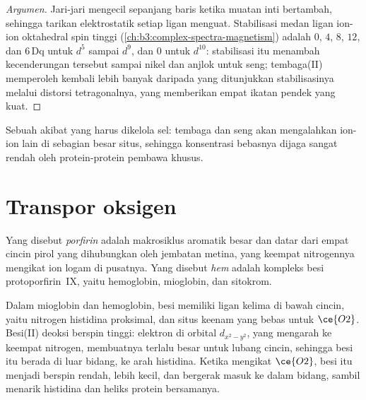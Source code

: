 \begin{proof}[Argumen]
Jari-jari mengecil sepanjang baris ketika muatan inti bertambah, sehingga
tarikan elektrostatik setiap ligan menguat. Stabilisasi medan ligan
ion-ion oktahedral spin tinggi (\cref{ch:b3:complex-spectra-magnetism}) adalah $0$, $4$,
$8$, $12$, dan $6\,\mathrm{Dq}$ untuk $d^5$ sampai $d^9$, dan $0$ untuk $d^{10}$: stabilisasi itu menambah kecenderungan tersebut sampai nikel dan
anjlok untuk seng; tembaga(II) memperoleh kembali lebih banyak daripada yang ditunjukkan stabilisasinya melalui
distorsi tetragonalnya, yang memberikan empat ikatan pendek yang kuat.
\end{proof}

Sebuah akibat yang harus dikelola sel: tembaga dan seng akan mengalahkan
ion-ion lain di sebagian besar situs, sehingga konsentrasi bebasnya dijaga sangat rendah
oleh protein-protein pembawa khusus.

\section{Transpor oksigen}

\begin{definition}\label{def:b3:bioinorganic:haem}
Yang disebut \emph{porfirin} adalah makrosiklus aromatik besar dan datar dari empat
cincin pirol yang dihubungkan oleh jembatan metina, yang keempat nitrogennya mengikat ion logam
di pusatnya. Yang disebut \emph{hem} adalah kompleks besi protoporfirin~IX,
yaitu  hemoglobin, mioglobin, dan sitokrom.
\end{definition}

Dalam mioglobin dan hemoglobin, besi  memiliki ligan kelima di bawah
cincin, yaitu nitrogen histidina proksimal, dan situs keenam yang bebas untuk $\ce{O2}$.
Besi(II) deoksi berspin tinggi: elektron di orbital $d_{x^2-y^2}$, yang mengarah ke keempat
nitrogen, membuatnya terlalu besar untuk lubang cincin, sehingga besi itu berada di luar
bidang, ke arah histidina. Ketika mengikat $\ce{O2}$, besi itu menjadi berspin rendah, lebih kecil, dan
bergerak masuk ke dalam bidang, sambil menarik histidina dan heliks protein bersamanya.

